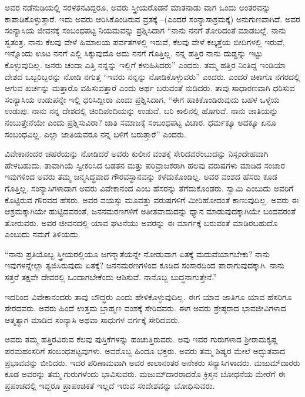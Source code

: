 ಅವರ ನಡೆನುಡಿಯಲ್ಲಿ ಸರಳತನವಿದ್ದರೂ, ಅವರು ಸ್ತ್ರೀಯರೊಡನೆ ಮಾತನಾಡು ವಾಗ ಒಂದು ಅಂತರವನ್ನು ಕಾಪಾಡಿಕೊಳ್ಳುತ್ತಾರೆ. ಇದು ಅವರು ಆರಿಸಿಕೊಂಡಿರುವ ವ್ರತಕ್ಕೆ –(ಎಂದರೆ ಸಂನ್ಯಾಸಾಶ್ರಮಕ್ಕೆ) ಅನುಗುಣವಾಗಿದೆ. ಅವರ ಸಂನ್ಯಾಸಿಯ ಜೀವನಕ್ಕೆ ಸಂಬಂಧಪಟ್ಟ ನಿಯಮವನ್ನು ಪ್ರಶ್ನಿಸಿದಾಗ “ನಾನು ನನಗೆ ತೋರಿದಂತೆ ಮಾಡಬಲ್ಲೆ. ನಾನು ಸ್ವತಂತ್ರ. ನಾನು ಕೆಲವು ವೇಳೆ ಹಿಮಾಲಯ ಪರ್ವತಗಳಲ್ಲಿ ಇರುವೆ, ಕೆಲವು ವೇಳೆ ಕಲ್ಕತ್ತೆಯ ಬೀದಿಗಳಲ್ಲಿ ಇರುವೆ, ಇನ್ನೊಂದು ಊಟ ನನಗೆ ಎಲ್ಲಿ ಸಿಕ್ಕುವುದೊ ಅದು ನನಗೆ ಗೊತ್ತಿಲ್ಲ. ನನ್ನ ಹತ್ತಿರ ನಾನು ದುಡ್ಡನ್ನು ಇಟ್ಟು ಕೊಳ್ಳುವುದಿಲ್ಲ. ಜನರು ಚಂದಾ ಎತ್ತಿ ನನ್ನನ್ನು ಇಲ್ಲಿಗೆ ಕಳುಹಿಸಿದರು” ಎಂದರು. ತಮ್ಮ ಹತ್ತಿರ ನಿಂತಿದ್ದ ಇಂಡಿಯಾ ದೇಶದ ಒಬ್ಬರಿಬ್ಬರನ್ನು ನೋಡಿ ನಗುತ್ತ “ಇವರು ನನ್ನನ್ನು ನೋಡಿಕೊಳ್ಳುವರು” ಎಂದರು. ಎಂದರೆ ಚಿಕಾಗೊ ನಗರದಲ್ಲಿ ಆಗುವ ಖರ್ಚನ್ನು ಮತ್ತಾರೊ ವಹಿಸುವತ್ತಾರೆ ಎಂದು ಅರ್ಥ ಬರುವಂತೆ ನುಡಿದರು. ತಾವು ಸಾಧಾರಣವಾಗಿ ಧರಿಸುವ ಸಂನ್ಯಾಸಿಯ ಉಡುಪನ್ನೇ ಇಲ್ಲಿ ಧರಿಸಿದ್ದೀರಾ ಎಂದು ಪ್ರಶ್ನಿಸಿದಾಗ, “ಈಗ ಹಾಕಿಕೊಂಡಿರುವುದು ಬಹಳ ಒಳ್ಳೆಯ ಉಡುಪು. ನಾನು ನನ್ನ ದೇಶದಲ್ಲಿ ಚಿಂದಿಪಂದಿಯನ್ನು ಉಡುವೆ. ಬರಿ ಕಾಲಿನಲ್ಲಿ ಹೊಗುವೆ. ನಾನು ಜಾತಿಯನ್ನು ನಂಬುತ್ತೇನೆಯೇ ಎಂದು ಪ್ರಶ್ನಿಸುವಿರಾ? ಜಾತಿ ಸಮಾಜಕ್ಕೆ ಸಂಬಂಧಪಟ್ಟ ವಿಚಾರ. ಧರ್ಮಕ್ಕೂ ಅದಕ್ಕೂ ಏನೂ ಸಂಬಂಧವಿಲ್ಲ. ಎಲ್ಲಾ ಜಾತಿಯವರೂ ನನ್ನ ಬಳಿಗೆ ಬರುತ್ತಾರೆ” ಎಂದರು.

ವಿವೇಕಾನಂದರ ಚಹರೆಯನ್ನು ನೋಡಿದರೆ ಅವರು ಕುಲೀನ ವಂಶಕ್ಕೆ ಸೇರಿದವರೆಂಬುದನ್ನು ನಿಸ್ಸಂದೇಹವಾಗಿ ಹೇಳಬಹುದು. ತಾವಾಗಿಯೆ ಸ್ವೀಕರಿಸಿದ ಬಡತನ ಮತ್ತು ಪರಿವ್ರಾಜಕರಾಗಿ ಹಲವು ವರುಷಗಳು ಮಾಡಿದ ಸಂಚಾರ ಇವುಗಳಿಂದ ಅವರು ತಮ್ಮ ಜನ್ಮಸಿದ್ಧವಾದ ಗೌರವಸ್ಥಾನವನ್ನು ಕಳೆದುಕೊಂಡಿಲ್ಲ. ಅವರ ವಂಶದ ಹೆಸರು ಕೂಡ ಗೊತ್ತಿಲ್ಲ. ಸಂನ್ಯಾಸಿಗಳಾದಾಗ ಅವರು ವಿವೇಕಾನಂದ ಎಂಬ ಹೆಸರನ್ನು ತೆಗೆದುಕೊಂಡರು. ಸ್ವಾಮಿ ಎಂಬುದು ಅವರಿಗೆ ಕೊಟ್ಟಿರುವ ಗೌರವದ ಹೆಸರು. ಅವರ ವಯಸ್ಸು ಮೂವತ್ತು ವರುಷಗಳಿಗೆ ಮೀರಿಹೋದಂತೆ ಕಾಣುವುದಿಲ್ಲ. ಅವರು ಈ ಆಶ್ರಮಕ್ಕಾಗಿಯೇ ಹುಟ್ಟಿದವ\break ರಂತೆ, ಜನನಮರಣಗಳಿಗೆ ಅತೀತವಾದುದನ್ನು ಧ್ಯಾನ ಮಾಡುವುದಕ್ಕಾಗಿಯೇ ಬಂದವ\break ರಂತೆ ತೋರುವರು. ಅವರ ಜೀವನದಲ್ಲಿ ಯಾವ ಘಟನೆಯು ಅವರನ್ನು ಈ ಮಾರ್ಗಕ್ಕೆ ಬರುವಂತೆ ಮಾಡಿರಬಹುದೊ ಎಂಬುದು ನಮಗೆ ತಿಳಿಯದು.

“ನಾನು ಪ್ರತಿಯೊಬ್ಬ ಸ್ತ್ರೀಯರಲ್ಲಿಯೂ ಜಗನ್ಮಾತೆಯನ್ನೇ ನೋಡುವಾಗ ಏತಕ್ಕೆ ಮದುವೆಯಾಗಬೇಕು? ನಾನು ಇವುಗಳನ್ನೇಲ್ಲಾ ತ್ಯಜಿಸಿರುವುದು ಏತಕ್ಕೆ? ಜನನಮರಣಗಳಿಂದ ಕೂಡಿದ ಸಂಸಾರದಿಂದ ಪಾರಾಗುವುದಕ್ಕಾಗಿ. ನಾನು ಸತ್ತರೆ ತಕ್ಷವೇ ದೇವರಲ್ಲಿ ಒಂದಾಗಬೇಕೆಂದು ಆಶಿಸುವೆ. ನಾನೊಬ್ಬ ಬುದ್ಧನಾಗುತ್ತೇನೆ.”

ಇದರಿಂದ ವಿವೇಕಾನಂದರು ತಾವು ಬೌದ್ಧರು ಎಂದು ಹೇಳಿಕೊಳ್ಳುವುದಿಲ್ಲ. ಈಗ ಯಾವ ಜಾತಿಗೂ ಯಾವ ಹೆಸರಿಗೂ ಸೇರದವರು. ಅವರು ಹಿಂದೆ ಉತ್ತಮ ಬ್ರಾಹ್ಮಣ ವಂಶಕ್ಕೆ ಸೇರಿದವರು. ಈಗ ಅವರು ಶ್ರೇಷ್ಠರಾದ ಭಾವಜೀವಿಗಳಾದ ಆತ್ಮತ್ಯಾಗ ಮಾಡಿದ ಸಂನ್ಯಾಸಿ ಅಥವಾ ಸಾಧುಗಳ ವರ್ಗಕ್ಕೆ ಸೇರಿದವರು.

ಅವರು ತಮ್ಮ ಹತ್ತಿರವಿರುವ ಕೆಲವು ಪುಸ್ತಿಕೆಗಳನ್ನು ಹಂಚುತ್ತಿರುವರು. ಅವು ಇವರ ಗುರುಗಳಾದ ಶ‍್ರೀರಾಮಕೃಷ್ಣ ಪರಮಹಂಸರಿಗೆ ಸಂಬಂಧಪಟ್ಟವುಗಳು. ಅವರೊಬ್ಬ ಹಿಂದೂ ಭಕ್ತರು. ಅವರು ತಮ್ಮ ಶಿಷ್ಯರ ಮೇಲೆ ಅದ್ಭುತವಾದ ಪ್ರಭಾವವನ್ನು ಬೀರಿದರು. ಇದರ ಪರಿಣಾಮವಾಗಿ ಅವರ ಕಾಲಾನಂತರ ಅನೇಕರು ಸನ್ಯಾಸಿಗಳಾದರು. ಮಜುಮ್​\break ದಾರರು ಕೂಡ ಅವರನ್ನು ತಮ್ಮ ಗುರುಗಳೆಂದು ಭಾವಿಸುವರು. ಮಜುಮ್​ದಾರರಾದರೊ ಕ್ರಿಸ್ತನ ಬೋಧನೆಯ ಮೇರೆಗೆ ಈ ಪ್ರಪಂಚದಲ್ಲಿ ಇದ್ದರೂ ಪ್ರಾಪಂಚಿಕತೆ ಇಲ್ಲದೆ ಇರುವ ಸಂದೇಶವನ್ನು ಬೋಧಿಸುವರು.

